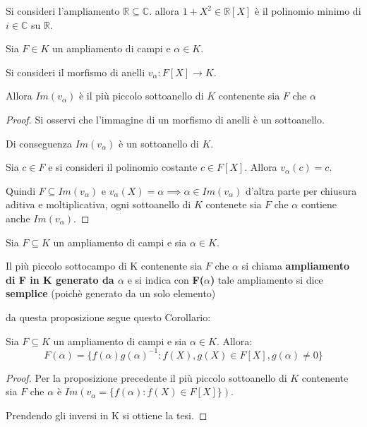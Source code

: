 \documentclass[../main.tex]{subfiles}
\begin{document}
\begin{example}
    Si consideri l'ampliamento $\mathbb{R} \subseteq \mathbb{C}$. allora $1 + X^2 \in \mathbb{R}[X]$ è il polinomio minimo di $i \in \mathbb{C}$ su $\mathbb{R}$.
\end{example}
\begin{proposition}
    Sia $F \in K$ un ampliamento di campi e $\alpha \in K$.

    Si consideri il morfismo di anelli $v_\alpha: F[X] \rightarrow K$.

    Allora $Im(v_\alpha)$ è il più piccolo sottoanello di $K$ contenente sia $F$ che $\alpha$
\end{proposition}
\begin{proof}
    Si osservi che l'immagine di un morfismo di anelli è un sottoanello.

    Di conseguenza $Im(v_\alpha)$ è un sottoanello di $K$.

    Sia $c \in F$ e si consideri il polinomio costante $c \in F[X]$. Allora $v_\alpha(c)=c$.

    Quindi $F \subseteq Im(v_\alpha)$ e $v_\alpha(X) = \alpha \implies \alpha \in Im(v_\alpha)$ d'altra parte per chiusura aditiva e moltiplicativa, ogni sottoanello di $K$ contenete sia $F$ che $\alpha$ contiene anche $Im(v_\alpha)$.
\end{proof}

\begin{proposition}
    Sia $F \subseteq K$ un ampliamento di campi e sia $\alpha \in K$.

    Il più piccolo sottocampo di K contenente sia $F$ che $\alpha$ si chiama \textbf{ampliamento di F in K generato da $\alpha$} e si indica con \textbf{F($\alpha$)} tale ampliamento si dice \textbf{semplice} (poichè generato da un solo elemento)
\end{proposition}

da questa proposizione segue questo Corollario:

\begin{corollary}
    Sia $F \subseteq K$ un ampliamento di campi e sia $\alpha \in K$. Allora:
    \begin{equation*}
        F(\alpha) = \{f(\alpha)g(\alpha)^{-1} : f(X),g(X) \in F[X], g(\alpha) \neq 0\}
    \end{equation*}
\end{corollary}
\begin{proof}
    Per la proposizione precedente il più piccolo sottoanello di $K$ contenente sia $F$ che $\alpha$ è $Im(v_\alpha = \{f(\alpha) : f(X) \in F[X]\})$.

    Prendendo gli inversi in K si ottiene la tesi.
\end{proof}
\end{document}
